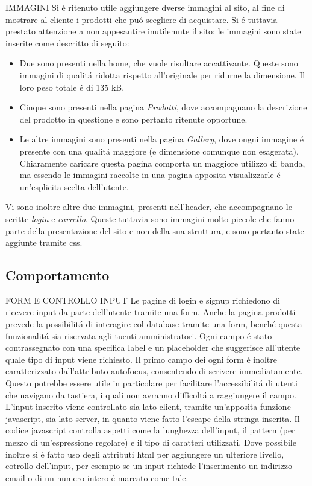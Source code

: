 		IMMAGINI
		Si \'e ritenuto utile aggiungere dverse immagini al sito, al fine di mostrare al cliente i prodotti che pu\'o scegliere di acquistare.
		Si \'e tuttavia prestato attenzione a non appesantire inutilemnte il sito: le immagini sono state inserite come descritto di seguito:
		\begin{itemize}
		\item Due sono presenti nella home, che vuole risultare accattivante. Queste sono immagini di qualit\'a ridotta rispetto all'originale per ridurne la dimensione. Il loro peso totale \'e di 135 kB.
		\item Cinque sono presenti nella pagina \emph{Prodotti}, dove accompagnano la descrizione del prodotto in questione e sono pertanto ritenute opportune.
		\item Le altre immagini sono presenti nella pagina \emph{Gallery}, dove ongni immagine \'e presente con una qualit\'a maggiore (e dimensione comunque non esagerata). Chiaramente caricare questa pagina comporta un maggiore utilizzo di banda, ma essendo le immagini raccolte in una pagina apposita visualizzarle \'e un'esplicita scelta dell'utente.
		\end{itemize}
		Vi sono inoltre altre due immagini, presenti nell'header, che accompagnano le scritte \emph{login} e \emph{carrello}.
		Queste tuttavia sono immagini molto piccole che fanno parte della presentazione del sito e non della sua struttura, e sono pertanto state aggiunte tramite css.


    \subsection{Comportamento}
		FORM E CONTROLLO INPUT
		Le pagine di login e signup richiedono di ricevere input da parte dell'utente tramite una form.
		Anche la pagina prodotti prevede la possibilit\'a di interagire col database tramite una form, bench\'e questa funzionalit\'a sia riservata agli tuenti amministratori.
		Ogni campo \'e stato contrassegnato con una specifica label e un placeholder che suggerisce all'utente quale tipo di input viene richiesto.
		Il primo campo dei ogni form \'e inoltre caratterizzato dall'attributo autofocus, consentendo di scrivere immediatamente.
		Questo potrebbe essere utile in particolare per facilitare l'accessibilit\'a di utenti che navigano da tastiera, i quali non avranno difficolt\'a  a raggiungere il campo.
		L'input inserito viene controllato sia lato client, tramite un'apposita funzione javascript, sia lato server, in quanto viene fatto l'escape della stringa inserita.
		Il codice javascript controlla aspetti come la lunghezza dell'input, il pattern (per mezzo di un'espressione regolare) e il tipo di caratteri utilizzati.
		Dove possibile inoltre si \'e fatto uso degli attributi html per aggiungere un ulteriore livello, cotrollo dell'input, per esempio se un input richiede l'inserimento un indirizzo email o di un numero intero \'e marcato come tale.

